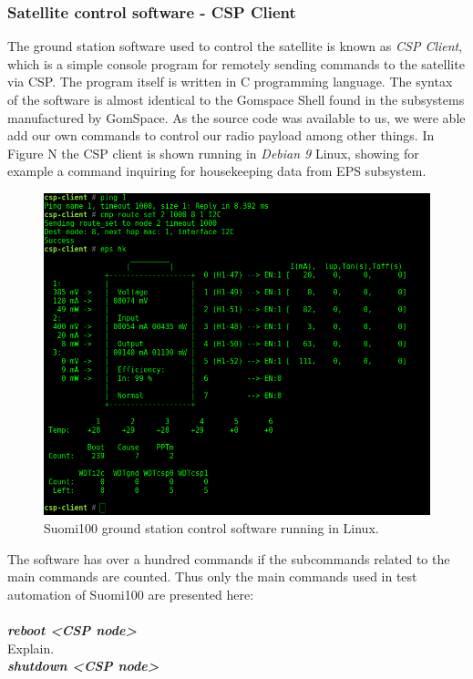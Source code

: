 \documentclass[english,12pt,a4paper,pdftex,elec,utf8]{aaltothesis}
\begin{document}
\subsubsection{Satellite control software - CSP Client}
The ground station software used to control the satellite is known as \textit{CSP Client}, which is a simple console program for remotely sending commands to the satellite via CSP. The program itself is written in C programming language. The syntax of the software is almost identical to the Gomspace Shell found in the subsystems manufactured by GomSpace. As the source code was available to us, we were able add our own commands to control our radio payload among other things. In Figure N the CSP client is shown running in \textit{Debian 9} Linux, showing for example a command inquiring for housekeeping data from EPS subsystem.\par 
\begin{figure}[h!]
\includegraphics[scale=0.3]{cspclient1}
\caption{Suomi100 ground station control software running in Linux.}
\end{figure}
The software has over a hundred commands if the subcommands related to the main commands are counted. Thus only the main commands used in test automation of Suomi100 are presented here:\\
\\
\textit{\textbf{reboot <CSP node>}}\\
Explain.\\
\textit{\textbf{shutdown <CSP node>}}\\
\end{document}
